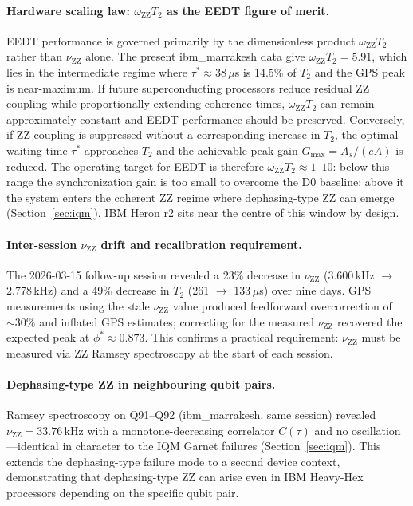 \documentclass[10pt,twocolumn]{article}
\newcommand{\nuZZ}{\nu_{\mathrm{ZZ}}}
\newcommand{\oZZ}{\omega_{\mathrm{ZZ}}}
\newcommand{\taustar}{\tau^*}
\begin{document}
\paragraph{Hardware scaling law: $\oZZ T_2$ as the EEDT figure of merit.}
EEDT performance is governed primarily by the dimensionless product
$\oZZ T_2$ rather than $\nuZZ$ alone.
The present ibm\_marrakesh data give $\oZZ T_2 = 5.91$, which lies in
the intermediate regime where $\taustar \approx 38\,\mu$s is 14.5\% of
$T_2$ and the GPS peak is near-maximum.
If future superconducting processors reduce residual ZZ coupling while
proportionally extending coherence times, $\oZZ T_2$ can remain
approximately constant and EEDT performance should be preserved.
Conversely, if ZZ coupling is suppressed without a corresponding increase
in $T_2$, the optimal waiting time $\taustar$ approaches $T_2$ and the
achievable peak gain $G_\mathrm{max} = A_s/(eA)$ is reduced.
The operating target for EEDT is therefore $\oZZ T_2 \approx 1$--$10$:
below this range the synchronization gain is too small to overcome the
D0 baseline; above it the system enters the coherent ZZ regime where
dephasing-type ZZ can emerge (Section~\ref{sec:iqm}).
IBM Heron r2 sits near the centre of this window by design.

\paragraph{Inter-session $\nuZZ$ drift and recalibration requirement.}
The 2026-03-15 follow-up session revealed a 23\% decrease in $\nuZZ$
(3.600\,kHz $\to$ 2.778\,kHz) and a 49\% decrease in $T_2$ (261 $\to$ 133\,$\mu$s)
over nine days. GPS measurements using the stale $\nuZZ$ value produced
feedforward overcorrection of $\sim30\%$ and inflated GPS estimates; correcting
for the measured $\nuZZ$ recovered the expected peak at $\phi^* \approx 0.873$.
This confirms a practical requirement: $\nuZZ$ must be measured via
ZZ Ramsey spectroscopy at the start of each session.

\paragraph{Dephasing-type ZZ in neighbouring qubit pairs.}
Ramsey spectroscopy on Q91--Q92 (ibm\_marrakesh, same session) revealed
$\nuZZ = 33.76\,\mathrm{kHz}$ with a monotone-decreasing correlator $C(\tau)$
and no oscillation---identical in character to the IQM Garnet failures
(Section~\ref{sec:iqm}). This extends the dephasing-type failure mode to a
second device context, demonstrating that dephasing-type ZZ can arise even in
IBM Heavy-Hex processors depending on the specific qubit pair.
\end{document}
